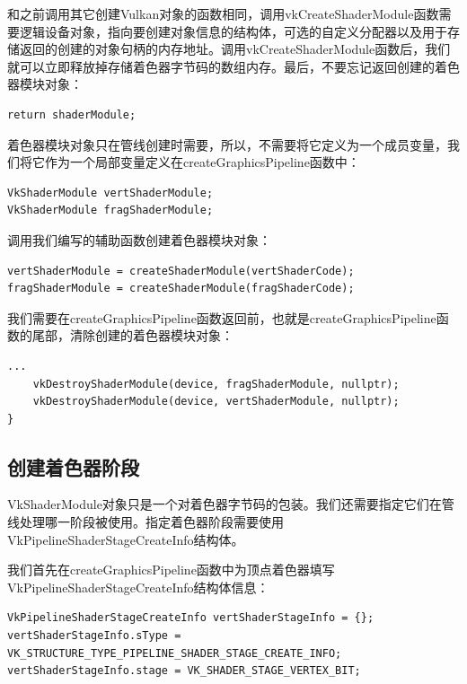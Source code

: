 \documentclass{ctexart}
\begin{document}
和之前调用其它创建Vulkan对象的函数相同，调用vkCreateShaderModule函数需要逻辑设备对象，指向要创建对象信息的结构体，可选的自定义分配器以及用于存储返回的创建的对象句柄的内存地址。调用vkCreateShaderModule函数后，我们就可以立即释放掉存储着色器字节码的数组内存。最后，不要忘记返回创建的着色器模块对象：

\begin{lstlisting}[language={[ANSI]C}]
return shaderModule;
\end{lstlisting}

着色器模块对象只在管线创建时需要，所以，不需要将它定义为一个成员变量，我们将它作为一个局部变量定义在createGraphicsPipeline函数中：

\begin{lstlisting}[language={[ANSI]C}]
VkShaderModule vertShaderModule;
VkShaderModule fragShaderModule;
\end{lstlisting}

调用我们编写的辅助函数创建着色器模块对象：

\begin{lstlisting}[language={[ANSI]C}]
vertShaderModule = createShaderModule(vertShaderCode);
fragShaderModule = createShaderModule(fragShaderCode);
\end{lstlisting}

我们需要在createGraphicsPipeline函数返回前，也就是createGraphicsPipeline函数的尾部，清除创建的着色器模块对象：

\begin{lstlisting}[language={[ANSI]C}]
		...
	vkDestroyShaderModule(device, fragShaderModule, nullptr);
	vkDestroyShaderModule(device, vertShaderModule, nullptr);
}
\end{lstlisting}

\subsection{创建着色器阶段}

VkShaderModule对象只是一个对着色器字节码的包装。我们还需要指定它们在管线处理哪一阶段被使用。指定着色器阶段需要使用VkPipelineShaderStageCreateInfo结构体。

我们首先在createGraphicsPipeline函数中为顶点着色器填写VkPipelineShaderStageCreateInfo结构体信息：

\begin{lstlisting}[language={[ANSI]C}]
VkPipelineShaderStageCreateInfo vertShaderStageInfo = {};
vertShaderStageInfo.sType = VK_STRUCTURE_TYPE_PIPELINE_SHADER_STAGE_CREATE_INFO;
vertShaderStageInfo.stage = VK_SHADER_STAGE_VERTEX_BIT;
\end{lstlisting}
\end{document}
